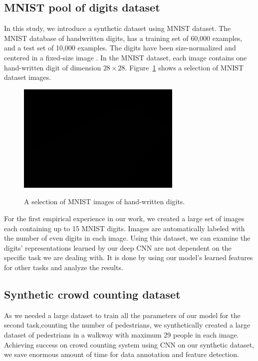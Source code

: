 \subsection{MNIST pool of digits dataset}

In this study, we introduce a synthetic dataset using MNIST dataset. The MNIST database of handwritten digits, has a training set of 60,000 examples, and a test set of 10,000 examples. The digits have been size-normalized and centered in a fixed-size image \cite{lecun1999mnist}. In the MNIST dataset, each image contains one hand-written digit of dimension $28\times28$. Figure~\ref{fig:mnistimages} shows a selection of MNIST dataset images.

\begin{figure}[H]
	\centering
	{\includegraphics[width=0.7\textwidth]{images/1}}
	\caption{A selection of MNIST images of hand-written digits.}
	\label{fig:mnistimages}
\end{figure}


\noindent For the first empirical experience in our work, we created a large set of images each containing up to 15 MNIST digits. Images are automatically labeled with the number of even digits in each image. Using this dataset, we can examine the digits' representations learned by our deep CNN are not dependent on the specific task we are dealing with. It is done by using our model's learned features for other tasks and analyze the results. 

\subsection{Synthetic crowd counting dataset}

As we needed a large dataset to train all the parameters of our model for the second task,counting the number of pedestrians, we synthetically created a large dataset of pedestrians in a walkway with maximum 29 people in each image. Achieving success on crowd counting system using CNN on our synthetic dataset, we save enormous amount of time for data annotation and feature detection. 


